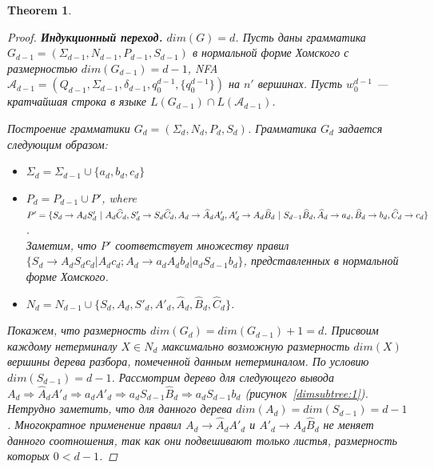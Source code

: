 \documentclass[11pt,a4paper]{article} %
\newtheorem{theorem}{Theorem}
\begin{document}
\begin{theorem}
\begin{proof}
\textbf{Индукционный переход.} $dim(G) = d$.
Пусть даны грамматика $G_{d-1} =  (\Sigma_{d-1}, N_{d-1}, P_{d-1}, S_{d-1})$ в нормальной форме Хомского с размерностью $dim(G_{d-1}) = d-1$, NFA $\mathcal{A}_{d-1}= (Q_{d-1},\Sigma_{d-1} ,\delta_{d-1} ,q^{d-1}_{0},\{q^{d-1}_{0}\})$ на $n'$ вершинах. Пусть $w_0^{d-1}$ --- кратчайшая строка в языке $L(G_{d-1}) \cap L(\mathcal{A}_{d-1})$.


\textit{Построение грамматики $G_d = (\Sigma_{d}, N_{d}, P_{d}, S_{d})$}. Грамматика $G_d$ задается следующим образом:
\begin{itemize}
\item $\Sigma_{d} = \Sigma_{d-1} \cup \{a_d, b_d, c_d\}$
\item $P_{d} = P_{d-1} \cup P'$, where $P' = 
\{ 
\\ S_d \rightarrow A_dS'_d\ \vert \ A_d\widehat{C}_d,
\\ S'_d \rightarrow S_d\widehat{C}_d,
\\A_d \rightarrow \widehat{A}_dA'_d,
\\A'_d \rightarrow A_d\widehat{B}_d \ \vert \ S_{d-1} \widehat{B}_d,
\\ \widehat{A}_d \rightarrow a_d,
\\ \widehat{B}_d \rightarrow b_d,
\\ \widehat{C}_d \rightarrow c_d
 \}$. 
\\ Заметим, что $P'$ соответствует множеству правил $\{  S_d \rightarrow A_dS_dc_d\vert A_dc_d; A_d \rightarrow a_dA_db_d \vert  a_dS_{d-1}b_d\}$, представленных в нормальной форме Хомского.
\item $N_d = N_{d-1} \cup \{S_d, A_d, S'_d, A'_d, \widehat{A}_d, \widehat{B}_d, \widehat{C}_d\}$. 

\end{itemize}
Покажем, что размерность $dim(G_d) = dim(G_{d-1}) + 1 = d$. Присвоим каждому нетерминалу $X \in N_d$ максимально возможную размерность $dim(X)$ вершины дерева разбора, помеченной данным нетерминалом. По условию $dim(S_{d-1}) = d-1$.
Рассмотрим дерево для следующего вывода $A_d \Rightarrow \widehat{A}_dA'_d \Rightarrow a_dA'_d \Rightarrow a_dS_{d-1} \widehat{B}_d \Rightarrow a_dS_{d-1} b_d$ (рисунок~\ref{dimsubtree:1}).  Нетрудно заметить, что для данного дерева $dim(A_d) = dim(S_{d-1}) = d-1$. Многократное применение правил $A_d \rightarrow \widehat{A}_dA'_d$ и $A'_d \rightarrow A_d\widehat{B}_d$ не меняет данного соотношения, так как они подвешивают только листья, размерность которых $0 < d - 1$. 



\end{proof}
\end{theorem}
\end{document}

